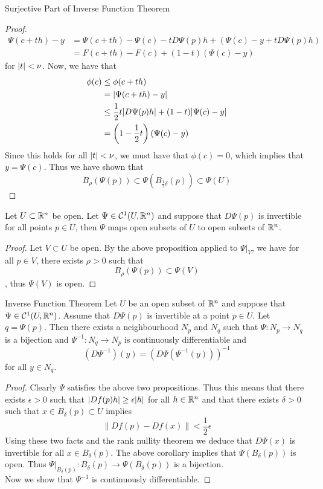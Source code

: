 \documentclass[a4paper]{article}
\begin{document}
\begin{prp}{Surjective Part of Inverse Function Theorem}{}
\begin{proof}
\begin{align*}
\Psi(c+th)-y&=\Psi(c+th)-\Psi(c)-tD\Psi(p)h+(\Psi(c)-y+tD\Psi(p)h)\\
&=F(c+th)-F(c)+(1-t)(\Psi(c)-y)
\end{align*}
for $\abs{t}<\nu$. 
Now, we have that 
\begin{align*}
\phi(c)&\leq\phi(c+th)\\
&=\abs{\Psi(c+th)-y}\\
&\leq\frac{1}{2}t\abs{D\Psi(p)h}+(1-t)\abs{\Psi(c)-y}\\
&=\left(1-\frac{1}{2}t\right)(\Psi(c)-y)
\end{align*}
Since this holds for all $\abs{t}<\nu$, we must have that $\phi(c)=0$, which implies that $y=\Psi(c)$. Thus we have shown that $$B_\rho(\Psi(p))\subset\Psi(B_{\frac{1}{2}\delta}(p))\subset\Psi(U)$$
\end{proof}
\end{prp}

\begin{crl}{}{} Let $U\subset\mathbb{R}^n$ be open. Let $\Psi\in\mathcal{C}^1(U,\mathbb{R}^n)$ and suppose that $D\Psi(p)$ is invertible for all points $p\in U$, then $\Psi$ maps open subsets of $U$ to open subsets of $\mathbb{R}^n$. 
\begin{proof}
Let $V\subset U$ be open. By the above proposition applied to $\Psi|_V$, we have for all $p\in V$, there exists $\rho>0$ such that $$B_{\rho}(\Psi(p))\subset\Psi(V)$$, thus $\Psi(V)$ is open. 
\end{proof}
\end{crl}

\begin{thm}{Inverse Function Theorem}{} Let $U$ be an open subset of $\mathbb{R}^n$ and suppose that $\Psi\in\mathcal{C}^1(U,\mathbb{R}^n)$. Assume that $D\Psi(p)$ is invertible at a point $p\in U$. Let $q=\Psi(p)$. Then there exists a neighbourhood $N_p$ and $N_q$ such that $\Psi:N_p\to N_q$ is a bijection and $\Psi^{-1}:N_q\to N_p$ is continuously differentiable and $$(D\Psi^{-1})(y)=(D\Psi(\Psi^{-1}(y)))^{-1}$$ for all $y\in N_q$. 
\begin{proof}
Clearly $\Psi$ satisfies the above two propositions. Thus this means that there exists $\epsilon>0$ such that $\abs{Df(p)h}\geq\epsilon\abs{h}$ for all $h\in\mathbb{R}^n$ and that there exists $\delta>0$ such that $x\in B_\delta(p)\subset U$ implies $$\|Df(p)-Df(x)\|<\frac{1}{2}\epsilon$$ Using these two facts and the rank nullity theorem we deduce that $D\Psi(x)$ is invertible for all $x\in B_\delta(p)$. The above corollary implies that $\Psi(B_\delta(p))$ is open. Thus $\Psi|_{B_\delta(p)}:B_\delta(p)\to\Psi(B_\delta(p))$ is a bijection. \\
Now we show that $\Psi^{-1}$ is continuously differentiable. 
\end{proof}
\end{thm}
\end{document}
